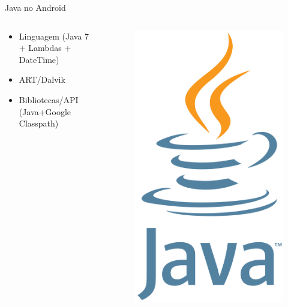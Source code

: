 \documentclass[aspectratio=169]{beamer}
\begin{document}
\begin{frame}[fragile]{Java no Android}

    \begin{columns}
        \begin{column}{0.5\textwidth}
            \begin{itemize}
                \item Linguagem (Java 7 + Lambdas + DateTime)
                \item ART/Dalvik
                \item Bibliotecas/API (Java+Google Classpath)
            \end{itemize}
        \end{column}
        \begin{column}{0.5\textwidth}  %
            \begin{figure}
                \centering
                \includegraphics[width=0.4\linewidth]{Images/java}
            \end{figure}
        \end{column}
    \end{columns}


\end{frame}
\end{document}
